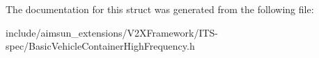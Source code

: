 The documentation for this struct was generated from the following file\+:\begin{DoxyCompactItemize}
\item 
include/aimsun\+\_\+extensions/\+V2\+X\+Framework/\+I\+T\+S-\/spec/Basic\+Vehicle\+Container\+High\+Frequency.\+h\end{DoxyCompactItemize}
